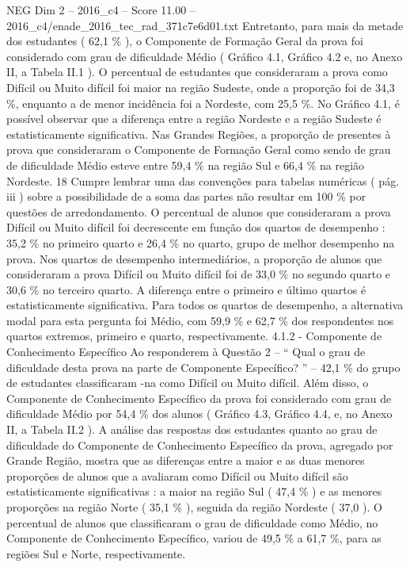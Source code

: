 \begin{textsample}{NEG Dim 2 – 2016\_c4 – Score 11.00 – 2016\_c4/enade\_2016\_tec\_rad\_371c7e6d01.txt}
Entretanto, para mais da metade dos estudantes ( 62,1 \% ), o Componente de Formação Geral da prova foi considerado com grau de dificuldade Médio ( Gráfico 4.1, Gráfico 4.2 e, no Anexo II, a Tabela II.1 ).
O percentual de estudantes que consideraram a prova como Difícil ou Muito difícil foi maior na região Sudeste, onde a proporção foi de 34,3 \%, enquanto a de menor incidência foi a Nordeste, com 25,5 \%.
No Gráfico 4.1, é possível observar que a diferença entre a região Nordeste e a região Sudeste é estatisticamente significativa.
Nas Grandes Regiões, a proporção de presentes à prova que consideraram o Componente de Formação Geral como sendo de grau de dificuldade Médio esteve entre 59,4 \% na região Sul e 66,4 \% na região Nordeste. 18 Cumpre lembrar uma das convenções para tabelas numéricas ( pág. iii ) sobre a possibilidade de a soma das partes não resultar em 100 \% por questões de arredondamento.
O percentual de alunos que consideraram a prova Difícil ou Muito difícil foi decrescente em função dos quartos de desempenho : 35,2 \% no primeiro quarto e 26,4 \% no quarto, grupo de melhor desempenho na prova.
Nos quartos de desempenho intermediários, a proporção de alunos que consideraram a prova Difícil ou Muito difícil foi de 33,0 \% no segundo quarto e 30,6 \% no terceiro quarto.
A diferença entre o primeiro e último quartos é estatisticamente significativa.
Para todos os quartos de desempenho, a alternativa modal para esta pergunta foi Médio, com 59,9 \% e 62,7 \% dos respondentes nos quartos extremos, primeiro e quarto, respectivamente. 4.1.2 - Componente de Conhecimento Específico Ao responderem à Questão 2 – “ Qual o grau de dificuldade desta prova na parte de Componente Específico? ” – 42,1 \% do grupo de estudantes classificaram -na como Difícil ou Muito difícil.
Além disso, o Componente de Conhecimento Específico da prova foi considerado com grau de dificuldade Médio por 54,4 \% dos alunos ( Gráfico 4.3, Gráfico 4.4, e, no Anexo II, a Tabela II.2 ).
A análise das respostas dos estudantes quanto ao grau de dificuldade do Componente de Conhecimento Específico da prova, agregado por Grande Região, mostra que as diferenças entre a maior e as duas menores proporções de alunos que a avaliaram como Difícil ou Muito difícil são estatisticamente significativas : a maior na região Sul ( 47,4 \% ) e as menores proporções na região Norte ( 35,1 \% ), seguida da região Nordeste ( 37,0 ).
O percentual de alunos que classificaram o grau de dificuldade como Médio, no Componente de Conhecimento Específico, variou de 49,5 \% a 61,7 \%, para as regiões Sul e Norte, respectivamente.

\end{textsample}
